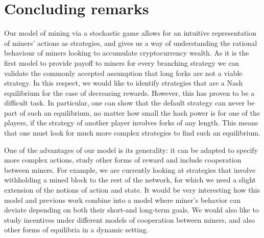 \section{Concluding remarks}
\label{sec-con-r}

Our model of mining via a stochastic game allows for an intuitive representation of miners' actions as strategies, 
and gives us a way of understanding the rational behaviour of miners looking to accumulate cryptocurrency wealth. As it is the first model to provide payoff to miners for every branching strategy we can validate the commonly accepted assumption that long forks are not a viable strategy.
In this respect, we would like to identify strategies that are a Nash equilibrium for the case of decreasing rewards. However, this has proven 
to be a difficult task. In particular, one can show that the default strategy can never be part of such an 
equilibrium, no matter how small the hash power is for one of the players, if the strategy of another player involves forks of any length. 
This means that one must look for much more complex strategies to find such an equilibrium. 

One of the advantages of our model is its generality: it can be adapted to specify more complex 
actions, study other forms of reward and include cooperation between miners. For example, 
we are currently looking at strategies that involve withholding 
a mined block to the rest of the network, for which we need a slight extension of the notions of action and state. 
It would be very interesting how this model and previous work combine into a model where miner's behavior can deviate depending on both their short-and long-term 
goals. We would also like to study incentives under different models of cooperation between miners, and 
also other forms of equilibria in a dynamic setting. 

